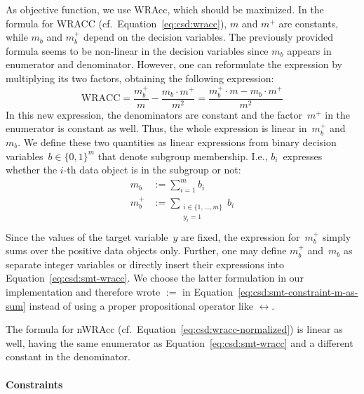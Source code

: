\documentclass{article}
\theoremstyle{definition}
\begin{document}
As objective function, we use WRAcc, which should be maximized.
In the formula for WRACC (cf.~Equation~\ref{eq:csd:wracc}), $m$ and $m^+$ are constants, while $m_b$ and $m_b^+$ depend on the decision variables.
The previously provided formula seems to be non-linear in the decision variables since $m_b$ appears in enumerator and denominator.
However, one can reformulate the expression by multiplying its two factors, obtaining the following expression:
%
\begin{equation}
	\text{WRACC} = \frac{m_b^+}{m} - \frac{m_b \cdot m^+}{m^2} = \frac{m_b^+ \cdot m - m_b \cdot m^+}{m^2}
	\label{eq:csd:smt-wracc}
\end{equation}
%
In this new expression, the denominators are constant and the factor~$m^+$ in the enumerator is constant as well.
Thus, the whole expression is linear in~$m_b^+$ and~$m_b$.
We define these two quantities as linear expressions from binary decision variables~$b \in \{0, 1\}^m$ that denote subgroup membership.
I.e., $b_i$~expresses whether the $i$-th data object is in the subgroup or not:
%
\begin{equation}
	\begin{aligned}
		 m_b &:= \sum_{i=1}^{m} b_i \\
		 m_b^+ &:= \sum_{\substack{i \in \{1, \dots, m\} \\ y_i = 1 }} b_i \\
	\end{aligned}
	\label{eq:csd:smt-constraint-m-as-sum}
\end{equation}
%
Since the values of the target variable~$y$ are fixed, the expression for~$m_b^+$ simply sums over the positive data objects only.
Further, one may define $m_b^+$ and~$m_b$ as separate integer variables or directly insert their expressions into Equation~\ref{eq:csd:smt-wracc}.
We choose the latter formulation in our implementation and therefore wrote $:=$ in Equation~\ref{eq:csd:smt-constraint-m-as-sum} instead of using a proper propositional operator like $\leftrightarrow$.

The formula for nWRAcc (cf.~Equation~\ref{eq:csd:wracc-normalized}) is linear as well, having the same enumerator as Equation~\ref{eq:csd:smt-wracc} and a different constant in the denominator.

\paragraph{Constraints}
\end{document}
